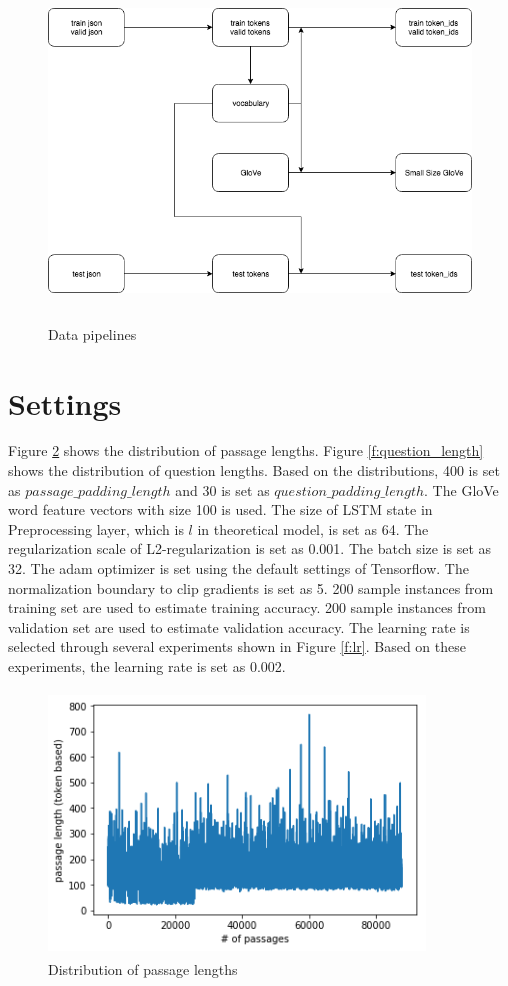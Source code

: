 \documentclass[modernstyle,12pt]{sjsuthesis}
\theoremstyle{definition}
\begin{document}
\begin{figure}[htbp]\centering
  \includegraphics[width=12cm, height=9cm]{figures/data.png}
  \caption{Data pipelines}
  \label{f:data}
\end{figure}




\section{Settings}

Figure \ref{f:passage_length} shows the distribution of passage lengths. Figure \ref{f:question_length} shows the distribution of question lengths. Based on the distributions, 400 is set as $passage\_padding\_length$ and 30 is set as $question\_padding\_length$. The GloVe word feature vectors with size 100 is used. The size of LSTM state in Preprocessing layer, which is $l$ in theoretical model, is set as 64. The regularization scale of L2-regularization is set as 0.001. The batch size is set as 32. The adam optimizer is set using the default settings of Tensorflow. The normalization boundary to clip gradients is set as 5. 200 sample instances from training set are used to estimate training accuracy. 200 sample instances from validation set are used to estimate validation accuracy. The learning rate is selected through several experiments shown in Figure \ref{f:lr}. Based on these experiments, the learning rate is set as 0.002.

\begin{figure}[htbp]\centering
  \includegraphics[width=10cm, height=7cm]{figures/passage_length.png}
  \caption{Distribution of passage lengths}
  \label{f:passage_length}
\end{figure}
\end{document}
